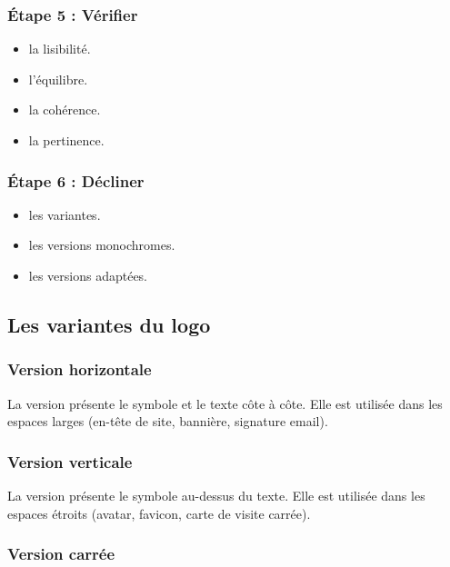 \subsubsection{Étape 5 : Vérifier}

\begin{itemize}
    \item {} la lisibilité.
    \item {} l'équilibre.
    \item {} la cohérence.
    \item {} la pertinence.
\end{itemize}

\subsubsection{Étape 6 : Décliner}

\begin{itemize}
    \item {} les variantes.
    \item {} les versions monochromes.
    \item {} les versions adaptées.
\end{itemize}

\subsection{Les variantes du logo}

\subsubsection{Version horizontale}

La version  présente le symbole et le texte côte à côte. Elle est utilisée dans les espaces larges (en-tête de site, bannière, signature email).

\subsubsection{Version verticale}

La version  présente le symbole au-dessus du texte. Elle est utilisée dans les espaces étroits (avatar, favicon, carte de visite carrée).

\subsubsection{Version carrée}

